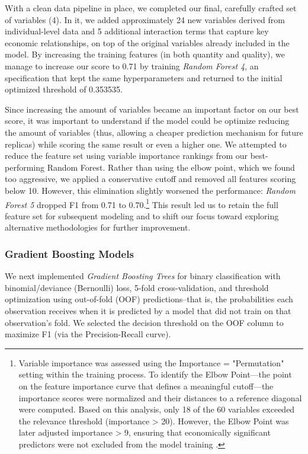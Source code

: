 \documentclass[12pt,a4paper,onecolumn]{article}
\begin{document}
With a clean data pipeline in place, we completed our final, carefully crafted set of variables (4). In it, we added approximately 24 new variables derived from individual-level data and 5 additional interaction terms that capture key economic relationships, on top of the original variables already included in the model. By increasing the training features (in both quantity and quality), we manage to increase our score to 0.71 by training \textit{Random Forest 4}, an specification that kept the same hyperparameters and returned to the initial optimized threshold of 0.353535.

Since increasing the amount of variables became an important factor on our best score, it was important to understand if the model could be optimize reducing the amount of variables (thus, allowing a cheaper prediction mechanism for future replicas) while scoring the same result or even a higher one. We attempted to reduce the feature set using variable importance rankings from our best-performing Random Forest. Rather than using the elbow point, which we found too aggressive, we applied a conservative cutoff and removed all features scoring below 10. However, this elimination slightly worsened the performance: \textit{Random Forest 5} dropped F1 from 0.71 to 0.70.\footnote{Variable importance was assessed using the Importance = "Permutation" setting within the training process. To identify the Elbow Point—the point on the feature importance curve that defines a meaningful cutoff—the importance scores were normalized and their distances to a reference diagonal were computed. Based on this analysis, only 18 of the 60 variables exceeded the relevance threshold (importance > 20). However, the Elbow Point was later adjusted importance > 9, ensuring that economically significant predictors were not excluded from the model training .} This result led us to retain the full feature set for subsequent modeling and to shift our focus toward exploring alternative methodologies for further improvement.

\subsubsection{Gradient Boosting Models}

We next implemented \textit{Gradient Boosting Trees} for binary classification with binomial/deviance (Bernoulli) loss, 5-fold cross-validation, and threshold optimization using out-of-fold (OOF) predictions--that is, the probabilities each observation receives when it is predicted by a model that did not train on that observation’s fold. We selected the decision threshold on the OOF column to maximize F1 (via the Precision-Recall curve).
\end{document}
